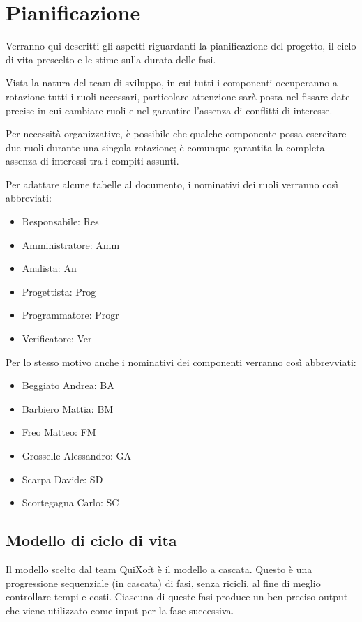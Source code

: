 \documentclass[11pt,a4paper]{article}
\begin{document}
\section{Pianificazione}
Verranno qui descritti gli aspetti riguardanti la pianificazione del progetto, il ciclo di vita prescelto e le stime sulla durata delle fasi.

Vista la natura del team di sviluppo, in cui tutti i componenti occuperanno a rotazione tutti i ruoli necessari, particolare attenzione sarà posta nel fissare date precise in cui cambiare ruoli e nel garantire l'assenza di conflitti di interesse.

Per necessità organizzative, è possibile che qualche componente possa esercitare due ruoli durante una singola rotazione; è comunque garantita la completa assenza di interessi tra i compiti assunti.
\bigskip

Per adattare alcune tabelle al documento, i nominativi dei ruoli verranno così abbreviati:
\begin{itemize}
\item Responsabile: Res
\item Amministratore: Amm
\item Analista: An
\item Progettista: Prog
\item Programmatore: Progr
\item Verificatore: Ver
\end{itemize}
\bigskip
Per lo stesso motivo anche i nominativi dei componenti verranno così abbrevviati:
\begin{itemize}
\item Beggiato Andrea: BA
\item Barbiero Mattia: BM
\item Freo Matteo: FM
\item Grosselle Alessandro: GA
\item Scarpa Davide: SD
\item Scortegagna Carlo: SC
\end{itemize}
\subsection{Modello di ciclo di vita}
Il modello scelto dal team QuiXoft è il modello a cascata.
Questo è una progressione sequenziale (in cascata) di fasi, senza ricicli, al fine di meglio controllare tempi e costi.
Ciascuna di queste fasi produce un ben preciso output che viene utilizzato come input per la fase successiva.
\end{document}
